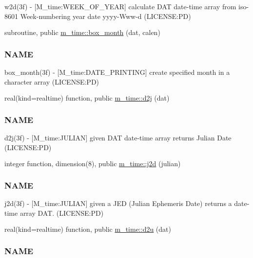 \begin{DoxyCompactItemize}
\begin{DoxyCompactList}
w2d(3f) -\/ \mbox{[}M\+\_\+time\+:W\+E\+E\+K\+\_\+\+O\+F\+\_\+\+Y\+E\+AR\mbox{]} calculate D\+AT date-\/time array from iso-\/8601 Week-\/numbering year date yyyy-\/\+Www-\/d (L\+I\+C\+E\+N\+SE\+:PD) \end{DoxyCompactList}\item 
subroutine, public \mbox{\hyperlink{namespacem__time_a0fe7540912df30d3578f3c469413aea8}{m\+\_\+time\+::box\+\_\+month}} (dat, calen)
\begin{DoxyCompactList}\small\item\em \subsubsection*{N\+A\+ME}

box\+\_\+month(3f) -\/ \mbox{[}M\+\_\+time\+:D\+A\+T\+E\+\_\+\+P\+R\+I\+N\+T\+I\+NG\mbox{]} create specified month in a character array (L\+I\+C\+E\+N\+SE\+:PD) \end{DoxyCompactList}\item 
real(kind=realtime) function, public \mbox{\hyperlink{namespacem__time_a3fccc53c2650104eff084c7998d18f54}{m\+\_\+time\+::d2j}} (dat)
\begin{DoxyCompactList}\small\item\em \subsubsection*{N\+A\+ME}

d2j(3f) -\/ \mbox{[}M\+\_\+time\+:J\+U\+L\+I\+AN\mbox{]} given D\+AT date-\/time array returns Julian Date (L\+I\+C\+E\+N\+SE\+:PD) \end{DoxyCompactList}\item 
integer function, dimension(8), public \mbox{\hyperlink{namespacem__time_a3ad5cad6df02c53e0429c3602a072e3c}{m\+\_\+time\+::j2d}} (julian)
\begin{DoxyCompactList}\small\item\em \subsubsection*{N\+A\+ME}

j2d(3f) -\/ \mbox{[}M\+\_\+time\+:J\+U\+L\+I\+AN\mbox{]} given a J\+ED (Julian Ephemeris Date) returns a date-\/time array D\+AT. (L\+I\+C\+E\+N\+SE\+:PD) \end{DoxyCompactList}\item 
real(kind=realtime) function, public \mbox{\hyperlink{namespacem__time_a1506e2889a156387df4481ed0534be81}{m\+\_\+time\+::d2u}} (dat)
\begin{DoxyCompactList}\small\item\em \subsubsection*{N\+A\+ME}


\end{DoxyCompactList}
\end{DoxyCompactItemize}
